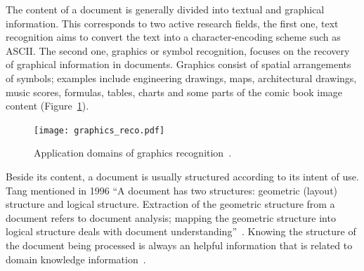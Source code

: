 


The content of a document is generally divided into textual and graphical information.
This corresponds to two active research fields, the first one, text recognition aims to convert the text into a character-encoding scheme such as ASCII.
The second one, graphics or symbol recognition, focuses on the recovery of graphical information in documents.
Graphics consist of spatial arrangements of symbols; examples include engineering drawings, maps, architectural drawings, music scores, formulas, tables, charts and some parts of the comic book image content (Figure~\ref{fig:sota:graphics_reco}).

    \begin{figure}[t]%
      \centering
      \texttt{[image: graphics\_reco.pdf]}
    \caption[Application domains of graphics recognition]{Application domains of graphics recognition~\cite{LladosIDIPSRecognition}.}
    \label{fig:sota:graphics_reco}
    \end{figure}

Beside its content, a document is usually structured according to its intent of use.
Tang mentioned in 1996 ``A document has two structures: geometric (layout) structure and logical structure.
Extraction of the geometric structure from a document refers to document analysis; mapping the geometric structure into logical structure deals with document understanding''~\cite{tang1996automatic}.
Knowing the structure of the document being processed is always an helpful information that is related to domain knowledge information~\cite{cooperman1998system,breuel2003high}.

